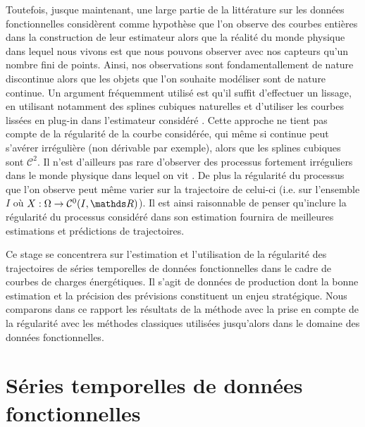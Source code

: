 Toutefois, jusque maintenant, une large partie de la littérature sur les données fonctionnelles considèrent comme hypothèse que l'on observe des courbes entières dans la construction de leur estimateur alors que la réalité du monde physique dans lequel nous vivons est que nous pouvons observer avec nos capteurs qu'un nombre fini de points. Ainsi, nos observations sont fondamentallement de nature discontinue alors que les objets que l'on souhaite modéliser sont de nature continue. Un argument fréquemment utilisé est qu'il suffit d'effectuer un lissage, en utilisant notamment des splines cubiques naturelles et d'utiliser les courbes lissées en plug-in dans l'estimateur considéré \citationrequise . 
Cette approche ne tient pas compte de la régularité de la courbe considérée, qui même si continue peut s'avérer irrégulière (non dérivable par exemple), alors que les splines cubiques sont $\mathcal C^2$. Il n'est d'ailleurs pas rare d'observer des processus fortement irréguliers dans le monde physique dans lequel on vit \exemplerequis. 
De plus la régularité du processus que l'on observe peut même varier sur la trajectoire de celui-ci (i.e. sur l'ensemble $I$ où $X : \Omega \rightarrow \mathcal C^0(I, \grandR)$). Il est ainsi raisonnable de penser qu'inclure la régularité du processus considéré dans son estimation fournira de meilleures estimations et prédictions de trajectoires. 

\bigskip

Ce stage se concentrera sur l'estimation et l'utilisation de la régularité des trajectoires de séries temporelles de données fonctionnelles dans le cadre de courbes de charges énergétiques. Il s'agit de données de production dont la bonne estimation et la précision des prévisions constituent un enjeu stratégique. Nous comparons dans ce rapport les résultats de la méthode avec la prise en compte de la régularité avec les méthodes classiques utilisées jusqu'alors dans le domaine des données fonctionnelles.

\section{Séries temporelles de données fonctionnelles}